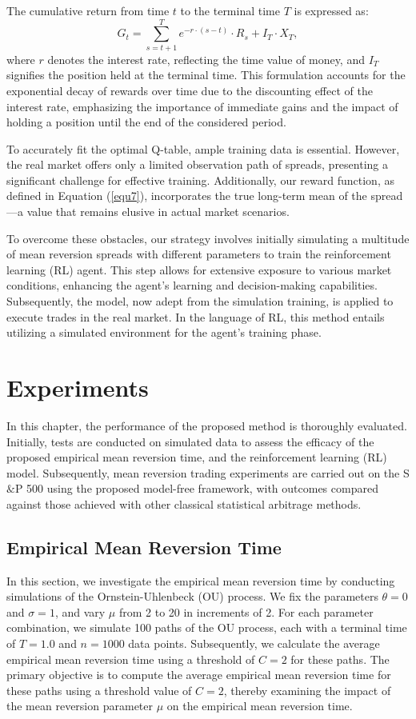 \documentclass{article}
\begin{document}
The cumulative return from time $t$ to the terminal time $T$ is expressed as:
\begin{equation}
    G_t = \sum_{s=t+1}^{T} e^{-r \cdot (s-t)} \cdot R_s + I_T \cdot X_T,
\end{equation}
where $r$ denotes the interest rate, reflecting the time value of money, and $I_T$ signifies the position held at the terminal time. This formulation accounts for the exponential decay of rewards over time due to the discounting effect of the interest rate, emphasizing the importance of immediate gains and the impact of holding a position until the end of the considered period.

To accurately fit the optimal Q-table, ample training data is essential. However, the real market offers only a limited observation path of spreads, presenting a significant challenge for effective training. Additionally, our reward function, as defined in Equation (\ref{equ7}), incorporates the true long-term mean of the spread—a value that remains elusive in actual market scenarios. 

To overcome these obstacles, our strategy involves initially simulating a multitude of mean reversion spreads with different parameters to train the reinforcement learning (RL) agent. This step allows for extensive exposure to various market conditions, enhancing the agent's learning and decision-making capabilities. Subsequently, the model, now adept from the simulation training, is applied to execute trades in the real market. In the language of RL, this method entails utilizing a simulated environment for the agent's training phase.

\section{Experiments}
\label{sec5}
In this chapter, the performance of the proposed method is thoroughly evaluated. Initially, tests are conducted on simulated data to assess the efficacy of the proposed empirical mean reversion time, and the reinforcement learning (RL) model. Subsequently, mean reversion trading experiments are carried out on the S$\&$P 500 using the proposed model-free framework, with outcomes compared against those achieved with other classical statistical arbitrage methods.

\subsection{Empirical Mean Reversion Time}
In this section, we investigate the empirical mean reversion time by conducting simulations of the Ornstein-Uhlenbeck (OU) process. We fix the parameters $\theta = 0$ and $\sigma = 1$, and vary $\mu$ from 2 to 20 in increments of 2. For each parameter combination, we simulate 100 paths of the OU process, each with a terminal time of $T=1.0$ and $n=1000$ data points. Subsequently, we calculate the average empirical mean reversion time using a threshold of $C=2$ for these paths. The primary objective is to compute the average empirical mean reversion time for these paths using a threshold value of \(C=2\), thereby examining the impact of the mean reversion parameter \(\mu\) on the empirical mean reversion time.
\end{document}
